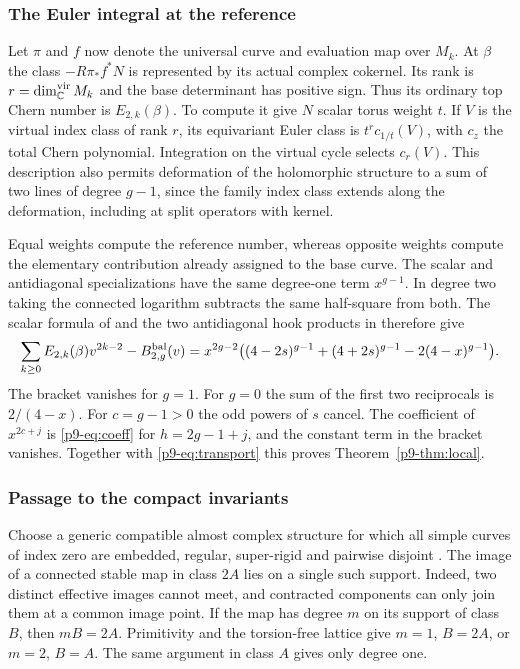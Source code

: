 \subsubsection{The Euler integral at the reference}
Let $\pi$ and $f$ now denote the universal curve and evaluation map
over $M_k$. At $\beta$ the class $-R\pi_* f^*N$ is represented by its
actual complex cokernel. Its rank is $r=\dim_{\mathbb C}^{\rm vir}M_k$ and
the base determinant has positive sign. Thus its ordinary top Chern
number is $E_{2,k}(\beta)$. To compute it give $N$ scalar torus weight
$t$. If $V$ is the virtual index class of rank $r$, its equivariant Euler
class is $t^r c_{1/t}(V)$, with $c_z$ the total Chern polynomial.
Integration on the virtual cycle selects $c_r(V)$. This description
also permits deformation of the holomorphic structure to a sum of
two lines of degree $g-1$, since the family index class extends along
the deformation, including at split operators with kernel.

Equal weights compute the reference number, whereas opposite weights
compute the elementary contribution already assigned to the base curve.
The scalar and antidiagonal specializations have the same degree-one
term $x^{g-1}$. In degree two taking the connected logarithm subtracts
the same half-square from both. The scalar formula of
\cite[\S8]{bp08} and the two antidiagonal hook products in
\cite[Corollary~7.2]{bp08} therefore give
\begin{align*}
 \sum_{k\ge0} E_{2,k}(\beta)v^{2k-2}-B_{2,g}^{\rm bal}(v)
  =x^{2g-2}\bigl((4-2s)^{g-1}+(4+2s)^{g-1}
                           -2(4-x)^{g-1}\bigr).
\end{align*}
The bracket vanishes for $g=1$. For $g=0$ the sum of the first
two reciprocals is $2/(4-x)$. For $c=g-1>0$ the odd powers of $s$
cancel. The coefficient of $x^{2c+j}$ is \eqref{p9-eq:coeff} for
$h=2g-1+j$, and the constant term in the bracket vanishes. Together
with \eqref{p9-eq:transport} this proves Theorem~\ref{p9-thm:local}.

\subsubsection{Passage to the compact invariants}
Choose a generic compatible almost complex structure for which all
simple curves of index zero are embedded, regular, super-rigid and
pairwise disjoint \cite[\S1]{bai}. The image of a connected stable
map in class $2A$ lies on a single such support. Indeed, two distinct
effective images cannot meet, and contracted components can only join
them at a common image point. If the map has degree $m$ on its support
of class $B$, then $mB=2A$. Primitivity and the torsion-free lattice
give $m=1$, $B=2A$, or $m=2$, $B=A$. The same argument in class $A$
gives only degree one.

